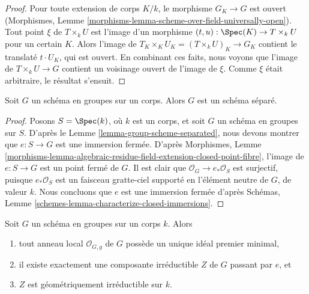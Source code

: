 \begin{proof}
Pour toute extension de corps $K/k$, le morphisme $G_K \to G$ est ouvert
(Morphismes, Lemme \ref{morphisms-lemma-scheme-over-field-universally-open}).
Tout point $\xi$ de $T \times_k U$ est l'image d'un morphisme
$(t, u) : \Spec(K) \to T \times_k U$ pour un certain $K$. Alors l'image de
$T_K \times_K U_K = (T \times_k U)_K \to G_K$ contient le translaté
$t \cdot U_K$, qui est ouvert. En combinant ces faits, nous voyons que
l'image de $T \times_k U \to G$ contient un voisinage ouvert de
l'image de $\xi$. Comme $\xi$ était arbitraire, le résultat s'ensuit.
\end{proof}

\begin{lemma}
\label{lemma-group-scheme-over-field-separated}
Soit $G$ un schéma en groupes sur un corps.
Alors $G$ est un schéma séparé.
\end{lemma}

\begin{proof}
Posons $S = \Spec(k)$, où $k$ est un corps, et soit $G$ un schéma en groupes
sur $S$. D'après
le Lemme \ref{lemma-group-scheme-separated},
nous devons montrer que $e : S \to G$ est une immersion fermée. D'après
Morphismes, Lemme
\ref{morphisms-lemma-algebraic-residue-field-extension-closed-point-fibre},
l'image de $e : S \to G$ est un point fermé de $G$.
Il est clair que $\mathcal{O}_G \to e_*\mathcal{O}_S$ est surjectif,
puisque $e_*\mathcal{O}_S$ est un faisceau gratte-ciel supporté en l'élément
neutre de $G$, de valeur $k$. Nous concluons que $e$ est une immersion fermée d'après
Schémas, Lemme \ref{schemes-lemma-characterize-closed-immersions}.
\end{proof}

\begin{lemma}
\label{lemma-group-scheme-field-geometrically-irreducible}
Soit $G$ un schéma en groupes sur un corps $k$.
Alors
\begin{enumerate}
\item tout anneau local $\mathcal{O}_{G, g}$ de $G$ possède un unique idéal
premier minimal,
\item il existe exactement une composante irréductible $Z$ de $G$
passant par $e$, et
\item $Z$ est géométriquement irréductible sur $k$.
\end{enumerate}
\end{lemma}

